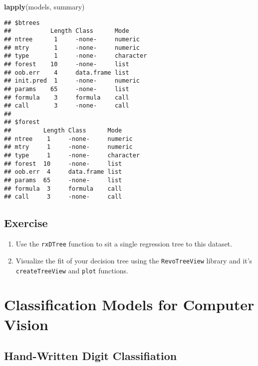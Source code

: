 \documentclass[]{book}
\newenvironment{Shaded}{\begin{snugshade}}{\end{snugshade}}
\newcommand{\KeywordTok}[1]{\textcolor[rgb]{0.13,0.29,0.53}{\textbf{#1}}}
\newcommand{\NormalTok}[1]{#1}
\providecommand{\tightlist}{%
  \setlength{\itemsep}{0pt}\setlength{\parskip}{0pt}}
\theoremstyle{definition}
\theoremstyle{definition}
\theoremstyle{definition}
\theoremstyle{remark}
\begin{document}
\begin{Shaded}
\begin{Highlighting}[]
\KeywordTok{lapply}\NormalTok{(models, summary)}
\end{Highlighting}
\end{Shaded}

\begin{verbatim}
## $btrees
##           Length Class      Mode     
## ntree      1     -none-     numeric  
## mtry       1     -none-     numeric  
## type       1     -none-     character
## forest    10     -none-     list     
## oob.err    4     data.frame list     
## init.pred  1     -none-     numeric  
## params    65     -none-     list     
## formula    3     formula    call     
## call       3     -none-     call     
## 
## $forest
##         Length Class      Mode     
## ntree    1     -none-     numeric  
## mtry     1     -none-     numeric  
## type     1     -none-     character
## forest  10     -none-     list     
## oob.err  4     data.frame list     
## params  65     -none-     list     
## formula  3     formula    call     
## call     3     -none-     call
\end{verbatim}

\section{Exercise}\label{exercise}

\begin{enumerate}
\def\labelenumi{\arabic{enumi}.}
\tightlist
\item
  Use the \texttt{rxDTree} function to sit a single regression tree to
  this dataset.
\item
  Visualize the fit of your decision tree using the
  \texttt{RevoTreeView} library and it's \texttt{createTreeView} and
  \texttt{plot} functions.
\end{enumerate}

\chapter{Classification Models for Computer
Vision}\label{classification-models-for-computer-vision}

\section{Hand-Written Digit
Classifiation}\label{hand-written-digit-classifiation}
\end{document}

